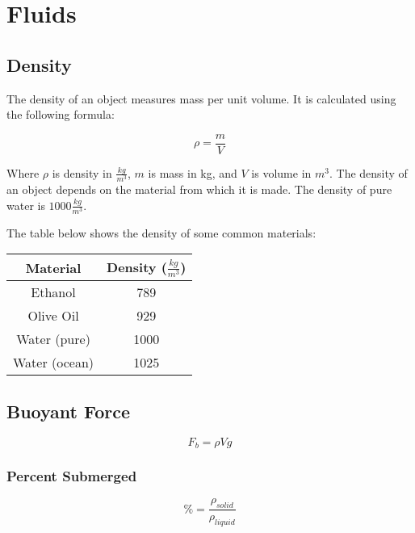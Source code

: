 \chapter{Fluids}
	\section{Density}
	The density of an object measures mass per unit volume.  It is calculated using the following formula:
		\begin{mdframed}[backgroundcolor=orange!20!white]
		\begin{equation}
		\rho = \frac{m}{V}
			\label{equation:density}
		\end{equation}
	\end{mdframed}	
	Where $\rho$ is density in $\frac{kg}{m^3}$, $m$ is mass in kg, and $V$ is volume in $m^3$.  The density of an object depends on the material from which it is made.  The density of pure water is $1000 \frac{kg}{m^3}$.
	
	The table below shows the density of some common materials:
	\begin{center}
		\begin{tabular}{|c|c|}
			\hline
			\textbf{Material} & \textbf{Density} ($\frac{kg}{m^3}$) \\
			\hline
			Ethanol &  789 \\
			\hline
			Olive Oil & 929 \\
			\hline
			Water (pure) & 1000 \\
			\hline 
			Water (ocean) & 1025 \\
			\hline
			
			
			
		\end{tabular}
	\end{center}
	
	
	
	\section{Buoyant Force}
			\begin{mdframed}[backgroundcolor=orange!20!white]
		\begin{equation}
			F_b = \rho V g
			\label{equation:buoyantforce}
		\end{equation}
	\end{mdframed}	

	\subsection{Percent Submerged}
				\begin{mdframed}[backgroundcolor=orange!20!white]
		\begin{equation}
			\% = \frac{\rho_{solid}}{\rho_{liquid}}
			\label{equation:percentsubmerged}
		\end{equation}
	\end{mdframed}
	
